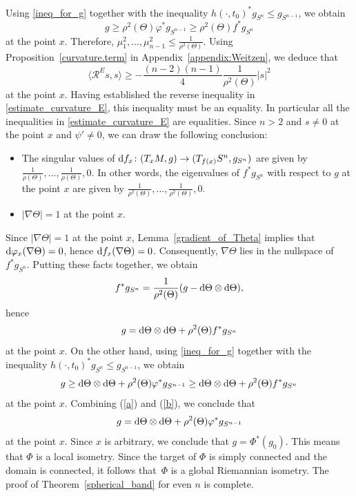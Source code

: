\documentclass[pdftex]{sigma}
\numberwithin{equation}{section}
\begin{document}
Using \eqref{ineq_for_g} together with the inequality $h(\cdot,t_0)^* g_{S^n} \leq g_{S^{n-1}}$, we obtain
\[g \geq \rho^2(\Theta) \varphi^* g_{S^{n-1}} \geq \rho^2(\Theta) f^* g_{S^n}\]
at the point $x$.
Therefore, $\mu_1^2,\hdots,\mu_{n-1}^2 \leq \frac{1}{\rho^2(\Theta)}$.
Using Proposition~\ref{curvature.term} in Appendix~\ref{appendix:Weitzen}, we deduce that
\[
 \big\langle \mathcal{R}^E s ,s \big\rangle \geq -\frac{(n-2)(n-1)}{4} \frac{1}{\rho^2(\Theta)} |s|^2
\]
at the point $x$.
Having established the reverse inequality in \eqref{estimate_curvature_E}, this inequality must be an equality.
In particular all the inequalities in \eqref{estimate_curvature_E} are equalities.
Since $n>2$ and $s \neq 0$ at the point $x$ and $\psi'\neq0$, we can draw the following conclusion:
\begin{itemize}\itemsep=0pt
\item The singular values of ${\rm d}f_x\colon (T_x M,g) \to (T_{f(x)} S^n,g_{S^n})$ are given by $\frac{1}{\rho(\Theta)}, \ldots, \frac{1}{\rho(\Theta)}, 0$. In other words, the eigenvalues of $f^* g_{S^n}$ with respect to $g$ at the point $x$ are given by $\frac{1}{\rho^2(\Theta)}, \ldots, \frac{1}{\rho^2(\Theta)}, 0$.
\item $|\nabla \Theta| = 1$ at the point $x$.
\end{itemize}
Since $|\nabla \Theta| = 1$ at the point $x$, Lemma~\ref{gradient_of_Theta} implies that ${\rm d}\varphi_x(\nabla \Theta) = 0$, hence ${\rm d}f_x(\nabla \Theta) = 0$.
Consequently, $\nabla \Theta$ lies in the nullspace of $f^* g_{S^n}$. Putting these facts together, we obtain
\[f^* g_{S^n} = \frac{1}{\rho^2(\Theta)} (g - {\rm d}\Theta \otimes{\rm d}\Theta),\]
hence
\begin{equation}
\label{a}
g = {\rm d}\Theta \otimes {\rm d}\Theta + \rho^2(\Theta) f^* g_{S^n}
\end{equation}
at the point $x$. On the other hand, using \eqref{ineq_for_g} together with the inequality $h(\cdot,t_0)^* g_{S^n} \leq g_{S^{n-1}}$, we obtain
\begin{equation}
\label{b}
g \geq {\rm d}\Theta \otimes {\rm d}\Theta + \rho^2(\Theta) \varphi^* g_{S^{n-1}} \geq {\rm d}\Theta \otimes {\rm d}\Theta + \rho^2(\Theta) f^* g_{S^n}
\end{equation}
at the point $x$. Combining (\ref{a}) and (\ref{b}), we conclude that
\[g = {\rm d}\Theta \otimes {\rm d}\Theta + \rho^2(\Theta) \varphi^* g_{S^{n-1}}\]
at the point $x$. Since $x$ is arbitrary, we conclude that $g= \Phi^*(g_0)$.
This means that $\Phi$ is a local isometry.
Since the target of $\Phi$ is simply connected and the domain is connected, it follows that~$\Phi$ is a global Riemannian isometry.
The proof of Theorem~\ref{spherical_band} for even $n$ is complete.
\end{document}
